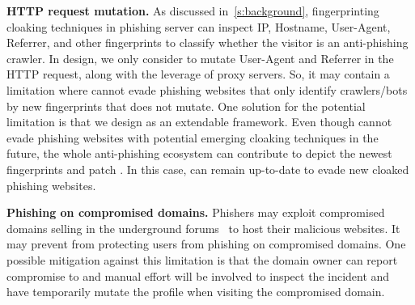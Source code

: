 \noindent
\textbf{HTTP request mutation.}
As discussed in~\autoref{s:background}, fingerprinting cloaking techniques in phishing server can inspect IP, Hostname, User-Agent, Referrer, and other fingerprints to classify whether the visitor is an anti-phishing crawler.
In \spartacus design, we only consider to mutate User-Agent and Referrer in the HTTP request, along with the leverage of proxy servers.
So, it may contain a limitation where \spartacus cannot evade phishing websites that only identify crawlers/bots by new fingerprints that \spartacus does not mutate.
One solution for the potential limitation is that we design \spartacus as an extendable framework.
Even though \spartacus cannot evade phishing websites with potential emerging cloaking techniques in the future,
the whole anti-phishing ecosystem can contribute to depict the newest fingerprints and patch \spartacus.
In this case, \spartacus can remain up-to-date to evade new cloaked phishing websites.

\noindent
\textbf{Phishing on compromised domains.}
Phishers may exploit compromised domains selling in the underground forums~\cite{sun2018understanding, sun2021having} to host their malicious websites.
It may prevent \spartacus from protecting users from phishing on compromised domains.
One possible mitigation against this limitation is that the domain owner can report compromise to \spartacus and manual effort will be involved to inspect the incident and have \spartacus temporarily mutate the profile when visiting the compromised domain.


